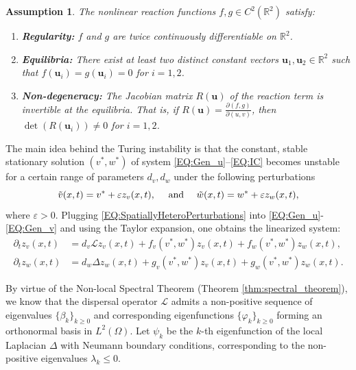 \documentclass[11pt, a4paper]{article}
\theoremstyle{break}
\theoremstyle{break}
\theoremstyle{break}
\newtheorem{asm}{Assumption}[section]
\theoremstyle{break}
\theoremstyle{break}
\theoremstyle{break}
\theoremstyle{break}
\theoremstyle{break}
\theoremstyle{break}
\begin{document}
\begin{asm} \label{asm:ReactionKinetics}
    The nonlinear reaction functions $f, g \in C^2(\mathbb{R}^2)$ satisfy:
    \begin{enumerate}[label=(\textit{F\arabic*})]
        \item \textbf{Regularity:} $f$ and $g$ are twice continuously differentiable on $\mathbb{R}^2$.
        \item \textbf{Equilibria:} There exist at least two distinct constant vectors $\mathbf{u}_1, \mathbf{u}_2 \in \mathbb{R}^2$ such that $f(\mathbf{u}_i) = g(\mathbf{u}_i) = 0$ for $i=1,2$.
        \item \textbf{Non-degeneracy:} The Jacobian matrix $R(\mathbf{u})$ of the reaction term is invertible at the equilibria. That is, if $R(\mathbf{u}) = \frac{\partial(f,g)}{\partial(u,v)}$, then $\det(R(\mathbf{u}_i)) \neq 0$ for $i=1,2$.
    \end{enumerate}
\end{asm}

The main idea behind the Turing instability is that the constant, stable stationary solution $(v^*, w^*)$ of system \eqref{EQ:Gen_u}--\eqref{EQ:IC} becomes unstable for a certain range of parameters $d_v, d_w$ under the following perturbations
\begin{equation}
    \label{EQ:SpatiallyHeteroPerturbations}
    \Tilde{v}(x,t) = v^* + \varepsilon z_v(x, t), \quad \text{ and } \quad \Tilde{w}(x,t) = w^* + \varepsilon z_w(x, t),
\end{equation}
where $\varepsilon > 0$. Plugging \eqref{EQ:SpatiallyHeteroPerturbations} into \eqref{EQ:Gen_u}-\eqref{EQ:Gen_v} and using the Taylor expansion, one obtains the linearized system:
\begin{align}
    \partial_t z_v(x, t) &= d_v \mathcal{L} z_v(x, t) + f_v(v^*, w^*) z_v(x, t) + f_w(v^*, w^*) z_w(x,t), \label{EQ:LinearizedKlausmeier_V}\\
    \partial_t z_w(x, t) &= d_w \Delta z_w(x, t) + g_v(v^*, w^*) z_v(x, t) + g_w(v^*, w^*) z_w(x,t). \label{EQ:LinearizedKlausmeier_W}
\end{align}

By virtue of the Non-local Spectral Theorem (Theorem \ref{thm:spectral_theorem}), we know that the dispersal operator $\mathcal{L}$ admits a non-positive sequence of eigenvalues $\{\beta_k\}_{k \geq 0}$ and corresponding eigenfunctions $\{\varphi_k\}_{k \geq 0}$ forming an orthonormal basis in $L^2(\Omega)$. Let $\psi_k$ be the $k$-th eigenfunction of the local Laplacian $\Delta$ with Neumann boundary conditions, corresponding to the non-positive eigenvalues $\lambda_k \le 0$. 
\end{document}
